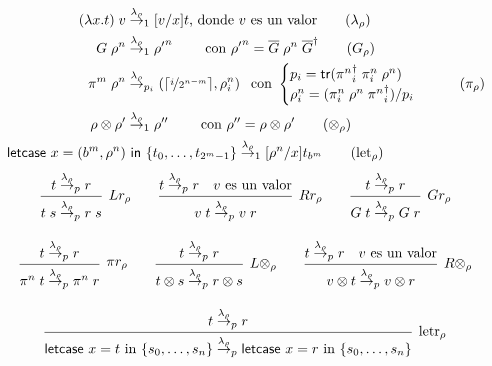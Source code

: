 \begin{definicion}
\label{def:reduccion_lambda}
\begin{align*}
(\lambda x.t)\;v &\redlam_1 [v/x]t \text{, donde $v$ es un valor} \tag{$\lambda_\rho$}\\
G\;\rho^n &\redlam_1 {\rho'}^n \qquad \text{ con } {\rho'}^n = \overline{G}\;\rho^n \;\adj{\overline{G}} \tag{$G_\rho$}\\
\pi^m\;\rho^n &\redlam_{p_i} (\lceil \nicefrac{i}{2^{n-m}}\rceil, \rho_i^n) \;\, \text{ con }
\begin{cases}
p_i = \tr(\adj{{\pi^n}_i}\;\pi^n_i\;\rho^n)\\
\rho^n_i = (\pi^n_i\;\rho^n\;\adj{{\pi^n}_i})/p_i
\end{cases} \tag{$\pi_\rho$}\\
\rho \otimes \rho' &\redlam_1 \rho'' \qquad \text{ con } \rho'' = \rho \otimes \rho'  \tag{$\otimes_\rho$}\\
\textsf{letcase } x = (b^m, \rho^n) &\textsf{ in } \{t_0, \dots, t_{2^m-1}\} \redlam_1 [\rho^n/x] t_{b^m} \tag{$\text{let}_\rho$}
\end{align*}
 \[\arraycolsep=10pt\def\arraystretch{2.6}
   \begin{array}{ccc}
         \infer[Lr_\rho]
         {t\;s\redlam_p r\;s}
         {t \redlam_p r}
     &
         \infer[Rr_\rho]
         {v\;t\redlam_p v\;r}
         {t \redlam_p r \quad v\text{ es un valor}}
     &
         \infer[Gr_\rho]
         {G\;t\redlam_p G\;r}
         {t \redlam_p r}
   \end{array}
 \]
 \[\arraycolsep=10pt\def\arraystretch{2.6}
   \begin{array}{cccc}
     \infer[\pi r_\rho]
     {\pi^n\;t \redlam_p \pi^n\;r}
     {t \redlam_p r}
     &
         \infer[L\otimes_\rho]
         {t\otimes s \redlam_p r \otimes s}
         {t \redlam_p r}
     &
         \infer[R\otimes_\rho]
         {v\otimes t \redlam_p v \otimes r}
         {t \redlam_p r \quad v\text{ es un valor}}
   \end{array} 
 \]
 \[\arraycolsep=10pt\def\arraystretch{2.6}
   \begin{array}{c}
     \infer[\text{letr}_\rho]
     {\textsf{letcase }x = t \textrm{ in } \{s_0,\dots,s_n\} \redlam_p \textsf{letcase }x = r \textrm{ in } \{s_0,\dots,s_n\} }
     {t \redlam_p r}
   \end{array}
 \]
\end{definicion}

